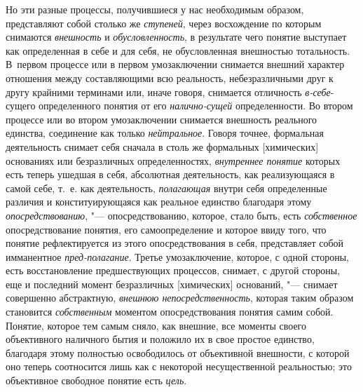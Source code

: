 {{Но эти разные процессы, получившиеся у нас необходимым
образом, представляют собой столько же
{\em ступеней}, через
восхождение по которым снимаются
{\em внешность} и
{\em обусловленность}, в
результате чего понятие выступает как определенная в себе и для себя, не
обусловленная внешностью тотальность. В~первом процессе или в первом
умозаключении снимается внешний характер отношения между составляющими всю
реальность, небезразличными друг к другу крайними терминами или, иначе
говоря, снимается отличность
{\em в-себе}-сущего
определенного понятия от его
{\em налично-сущей}
определенности. Во втором процессе или во втором
умозаключении снимается внешность реального единства, соединение как только
{\em нейтральное}. Говоря
точнее, формальная деятельность снимает себя сначала в столь же формальных
[химических] основаниях или безразличных определенностях,
{\em внутреннее понятие}
которых есть теперь ушедшая в себя, абсолютная деятельность,
как реализующаяся в самой себе, т.~е. как деятельность,
{\em полагающая} внутри
себя определенные различия и конституирующаяся как реальное единство
благодаря этому {\em опосредствованию},
"--- опосредствованию, которое, стало быть, есть
{\em собственное}
опосредствование понятия, его самоопределение и которое ввиду
того, что понятие рефлектируется из этого опосредствования в себя,
представляет собой имманентное
{\em пред-полагание}.
Третье умозаключение, которое, с одной стороны, есть
восстановление предшествующих процессов, снимает, с другой стороны, еще и
последний момент безразличных [химических] оснований, "---
снимает совершенно абстрактную,
{\em внешнюю непосредственность},
которая таким образом становится
{\em собственным}
моментом опосредствования понятия самим собой. Понятие,
которое тем самым сняло, как внешние, все моменты своего объективного
наличного бытия и положило их в свое простое единство, благодаря этому
полностью освободилось от объективной внешности, с которой оно теперь
соотносится лишь как с некоторой несущественной реальностью; это
объективное свободное понятие есть
{\em цель}.

}}
